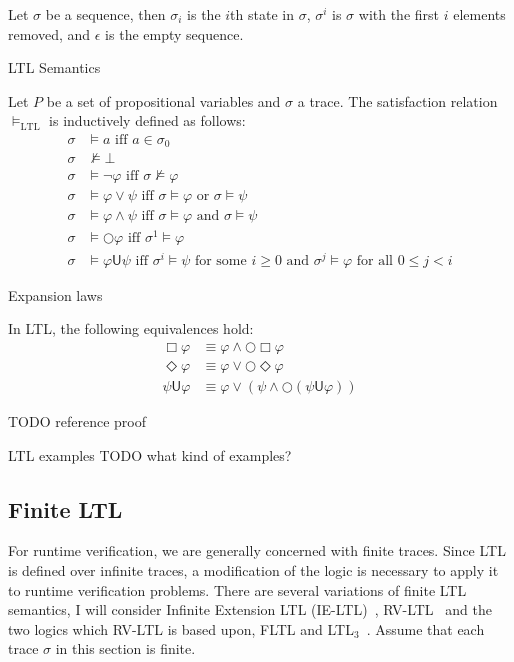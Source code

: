 \documentclass[a4paper]{article}
\newcommand{\U}{\mathsf{U}}
\newcommand{\tand}{\text{ and }}
\newcommand{\tor}{\text{ or }}
\newcommand{\tiff}{\text{ iff }}
\newcommand{\fsome}{\text{ for some }}
\newcommand{\fall}{\text{ for all }}
\begin{document}
\begin{notn}
Let $\sigma$ be a sequence, then $\sigma_i$ is the $i$th state in $\sigma$, $\sigma^i$ is $\sigma$ with the first $i$ elements removed, and $\epsilon$ is the empty sequence.
\end{notn}

\begin{defn}{LTL Semantics}\label{ltlsem}

  Let $P$ be a set of propositional variables and $\sigma$ a trace. The satisfaction relation $\vDash_{\text{LTL}}$ is inductively defined as follows:
\begin{align*}
  \sigma &\vDash a \tiff a \in \sigma_0\\
  \sigma &\nvDash \bot\\
  \sigma &\vDash \neg \varphi \tiff \sigma \nvDash \varphi\\
  \sigma &\vDash \varphi \lor \psi \tiff \sigma \vDash \varphi \tor \sigma \vDash \psi\\
  \sigma &\vDash \varphi \land \psi \tiff \sigma \vDash \varphi \tand \sigma \vDash \psi\\
  \sigma &\vDash \bigcirc \varphi \tiff \sigma^1 \vDash \varphi\\
  \sigma &\vDash \varphi \U \psi \tiff \sigma^i \vDash \psi \fsome i \geq 0 \tand \sigma^j \vDash \varphi \fall 0 \leq j < i
\end{align*}

\end{defn}

\begin{lem}{Expansion laws}\label{ltlexp}

  In LTL, the following equivalences hold:
  \begin{align}
    \Box \varphi &\equiv \varphi \land \bigcirc \Box \varphi\label{elbox}\\
    \Diamond \varphi &\equiv \varphi \lor \bigcirc \Diamond \varphi\label{eldiamond}\\
    \psi \U \varphi &\equiv \varphi \lor (\psi \land \bigcirc (\psi \U \varphi))\label{elU}
  \end{align}

\end{lem}

TODO reference proof

\begin{eg}{LTL examples}
  TODO what kind of examples?
\end{eg}


\subsection{Finite LTL}
For runtime verification, we are generally concerned with finite traces. Since LTL is defined over infinite traces, a modification of the logic is necessary to apply it to runtime verification problems. %
There are several variations of finite LTL semantics, I will consider Infinite Extension LTL (IE-LTL)~\autocite{rosu2005rewriting}, RV-LTL~\autocite{bauer2010comparing} and the two logics which RV-LTL is based upon, FLTL and LTL$_3$~\autocite{bauer2010comparing}.
Assume that each trace $\sigma$ in this section is finite.
\end{document}
